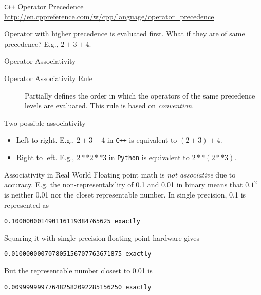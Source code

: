 \documentclass[presentation]{beamer}
\begin{document}
\begin{frame}[fragile,label={sec:orgheadline6}]{\texttt{C++} Operator Precedence}
 \url{http://en.cppreference.com/w/cpp/language/operator_precedence}

Operator with higher precedence is evaluated first.  What if they
are of same precedence?  E.g., \(2 + 3 + 4\).
\end{frame}

\begin{frame}[fragile,label={sec:orgheadline7}]{Operator Associativity}
 \begin{description}
\item[{Operator Associativity Rule}] Partially defines the order in
which the operators of the same precedence levels are
evaluated.  This rule is based on \emph{convention}.
\end{description}


Two possible associativity
\begin{itemize}
\item Left to right.  E.g., \(2 + 3 + 4\) in \texttt{C++} is equivalent to
\((2 + 3) + 4\).
\item Right to left.  E.g., \(2 ** 2 ** 3\) in \texttt{Python} is equivalent
to \(2 ** (2 ** 3)\).
\end{itemize}
\end{frame}

\begin{frame}[fragile,label={sec:orgheadline8}]{Associativity in Real World}
 Floating point math is \emph{not associative} due to accuracy.  E.g. the
non-representability of 0.1 and 0.01 in binary means that \(0.1^2\)
is neither 0.01 nor the closet representable number.  In single
precision, 0.1 is represented as

\begin{verbatim}
0.100000001490116119384765625 exactly
\end{verbatim}

Squaring it with single-precision floating-point hardware gives

\begin{verbatim}
0.010000000707805156707763671875 exactly
\end{verbatim}

But the representable number closest to 0.01 is

\begin{verbatim}
0.009999999776482582092285156250 exactly
\end{verbatim}
\end{frame}
\end{document}

